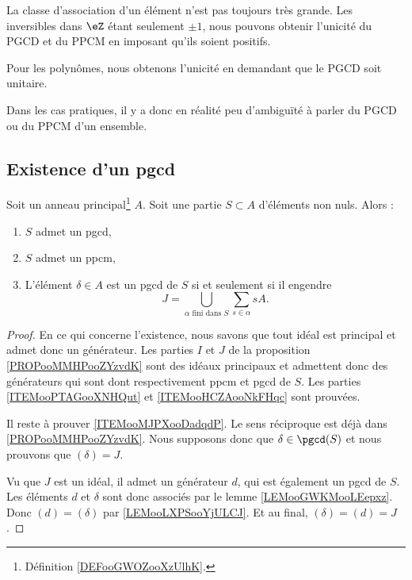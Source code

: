 \begin{remark}
	La classe d'association d'un élément n'est pas toujours très grande. Les inversibles dans \( \eZ\) étant seulement \( \pm 1\), nous pouvons obtenir l'unicité du PGCD et du PPCM en imposant qu'ils soient positifs.

	Pour les polynômes, nous obtenons l'unicité en demandant que le PGCD soit unitaire.

	Dans les cas pratiques, il y a donc en réalité peu d'ambiguïté à parler du PGCD ou du PPCM d'un ensemble.
\end{remark}


\subsection{Existence d'un pgcd}


\begin{proposition}	\label{PROPooPZXNooNpVZCm}
	Soit un anneau principal\footnote{Définition \ref{DEFooGWOZooXzUlhK}.} \( A\). Soit une partie \( S\subset A\) d'éléments non nuls. Alors :
	\begin{enumerate}
		\item		\label{ITEMooPTAGooXNHQut}
		      \( S\) admet un pgcd,
		\item		\label{ITEMooHCZAooNkFHqc}
		      \( S\) admet un ppcm,
		\item		\label{ITEMooMJPXooDadqdP}
		      L'élément \( \delta\in A\) est un pgcd de \( S\) si et seulement si il engendre
		      \begin{equation}
			      J=\bigcup_{\alpha\text{ fini dans } S}\sum_{s\in \alpha}sA.
		      \end{equation}
	\end{enumerate}
\end{proposition}

\begin{proof}
	En ce qui concerne l'existence, nous savons que tout idéal est principal et admet donc un générateur. Les parties \( I\) et \( J\) de la proposition \ref{PROPooMMHPooZYzvdK} sont des idéaux principaux et admettent donc des générateurs qui sont dont respectivement ppcm et pgcd de \( S\). Les parties \ref{ITEMooPTAGooXNHQut} et \ref{ITEMooHCZAooNkFHqc} sont prouvées.

	Il reste à prouver \ref{ITEMooMJPXooDadqdP}. Le sens réciproque est déjà dans \ref{PROPooMMHPooZYzvdK}. Nous supposons donc que \( \delta\in\pgcd(S)\) et nous prouvons que \( (\delta)=J\).

	Vu que \( J\) est un idéal, il admet un générateur \( d\), qui est également un pgcd de \( S\). Les éléments \( d\) et \( \delta\) sont donc associés par le lemme \ref{LEMooGWKMooLEepxz}. Donc \( (d)=(\delta)\) par \ref{LEMooLXPSooYjULCJ}. Et au final, \( (\delta)=(d)=J\).
\end{proof}


